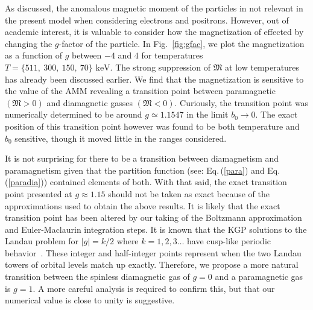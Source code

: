 \documentclass[reprint]{revtex4-2}
\newcommand*{\keV}{\text{ keV}}
\newcommand{\req}[1]{Eq.\,(\ref{#1})}
\newcommand{\rf}[1]{Fig.~{\ref{#1}}}
\begin{document}
\noindent As discussed, the anomalous magnetic moment of the particles in not relevant in the present model when considering electrons and positrons. However, out of academic interest, it is valuable to consider how the magnetization of effected by changing the $g$-factor of the particle. In \rf{fig:gfac}, we plot the magnetization as a function of $g$ between $-4$ and $4$ for temperatures $T=\{511,\ 300,\ 150,\ 70\}\keV$. The strong suppression of ${\mathfrak M}$ at low temperatures has already been discussed earlier. We find that the magnetization is sensitive to the value of the AMM revealing a transition point between paramagnetic $({\mathfrak M}>0)$ and diamagnetic gasses $({\mathfrak M}<0)$. Curiously, the transition point was numerically determined to be around $g\simeq1.1547$ in the limit $b_{0}\rightarrow0$. The exact position of this transition point however was found to be both temperature and $b_{0}$ sensitive, though it moved little in the ranges considered.

It is not surprising for there to be a transition between diamagnetism and paramagnetism given that the partition function (see: \req{para} and \req{paradia}) contained elements of both. With that said, the exact transition point presented at $g\approx1.15$ should not be taken as exact because of the approximations used to obtain the above results. It is likely that the exact transition point has been altered by our taking of the Boltzmann approximation and Euler-Maclaurin integration steps. It is known that the KGP solutions to the Landau problem for $|g|=k/2$ where $k=1,2,3\ldots$ have cusp-like periodic behavior~\cite{steinmetz2018magnetic,rafelski2022study}. These integer and half-integer points represent when the two Landau towers of orbital levels match up exactly. Therefore, we propose a more natural transition between the spinless diamagnetic gas of $g=0$ and a paramagnetic gas is $g=1$. A more careful analysis is required to confirm this, but that our numerical value is close to unity is suggestive.

\end{document}

